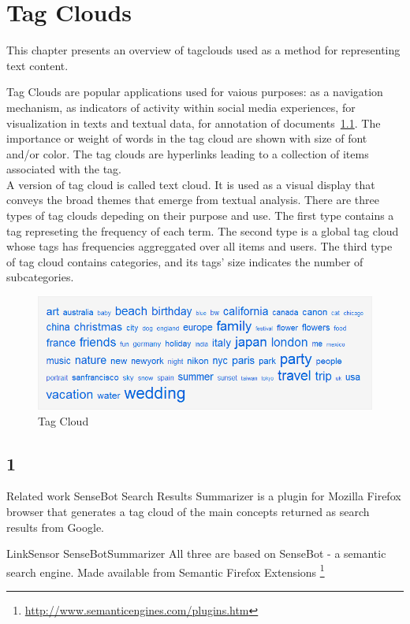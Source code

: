\chapter{Tag Clouds}
\label{sec:semannot}

\begin{summary}
This chapter presents an overview of tagclouds used as a method for representing text content.
\end{summary}

Tag Clouds are popular applications used for vaious purposes: as a navigation mechanism, as indicators of activity within social media experiences, for visualization in texts and textual data, for annotation of documents~\ref{fig:tagcloud}. The importance or weight of words in the tag cloud are shown with size of font and/or color. The tag clouds are hyperlinks leading to a collection of items associated with the tag.\\
A version of tag cloud is called text cloud. It is used as a visual display that conveys the broad themes that emerge from textual analysis.  
There are three types of tag clouds depeding on their purpose and use. The first type contains a tag represeting the frequency of each term. The second type is a global tag cloud whose tags has frequencies aggreggated over all items and users. The third type of tag cloud contains categories, and its tags' size indicates the number of subcategories.\\
%
%
\begin{figure}[htbp]
	\centering
	\includegraphics[width=\ScaleIfNeeded]{img/tagcloud} 
	\caption{Tag Cloud}
	\label{fig:tagcloud}
\end{figure}

\section{1}
\label{sec:semannot:1}
Related work 
SenseBot Search Results Summarizer is a plugin for Mozilla Firefox browser that generates a tag cloud of the main concepts returned as search results from Google.

LinkSensor
SenseBotSummarizer
All three are based on SenseBot - a semantic search engine.
Made available from Semantic Firefox Extensions \footnote{\url{http://www.semanticengines.com/plugins.htm}}
